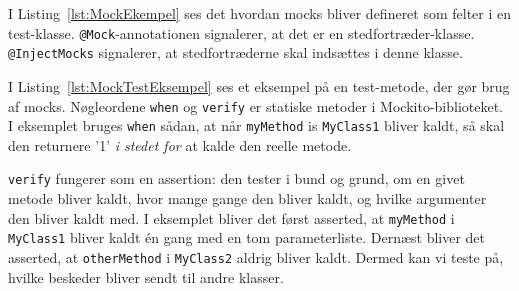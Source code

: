 I Listing~\ref{lst:MockEkempel} ses det hvordan mocks bliver defineret som felter i en test-klasse. \texttt{@Mock}-annotationen signalerer, at det er en stedfortræder-klasse. \texttt{@InjectMocks} signalerer, at stedfortræderne skal indsættes i denne klasse.

I Listing~\ref{lst:MockTestEksempel} ses et eksempel på en test-metode, der gør brug af mocks. Nøgleordene \texttt{when} og \texttt{verify} er statiske metoder i Mockito-biblioteket. I eksemplet bruges \texttt{when} sådan, at når \texttt{myMethod} is \texttt{MyClass1} bliver kaldt, så skal den returnere '1' \textit{i stedet for} at kalde den reelle metode. 



\texttt{verify} fungerer som en assertion: den tester i bund og grund, om en givet metode bliver kaldt, hvor mange gange den bliver kaldt, og hvilke argumenter den bliver kaldt med. I eksemplet bliver det først asserted, at \texttt{myMethod} i \texttt{MyClass1} bliver kaldt én gang med en tom parameterliste. Dernæst bliver det asserted, at \texttt{otherMethod} i \texttt{MyClass2} aldrig bliver kaldt. Dermed kan vi teste på, hvilke beskeder bliver sendt til andre klasser.

